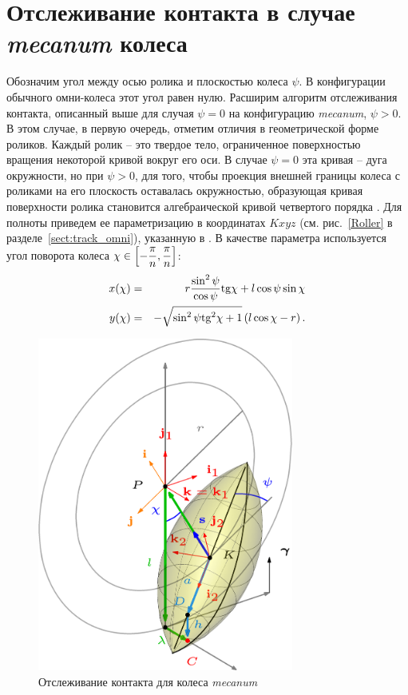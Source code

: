 \section{Отслеживание контакта в случае \textit{mecanum} колеса}\label{sect:track_mecanum}

Обозначим угол между осью ролика и плоскостью колеса $\psi$. В конфигурации обычного омни-колеса этот угол равен нулю. Расширим алгоритм отслеживания контакта, описанный выше для случая $\psi = 0$ на конфигурацию \textit{mecanum}, $\psi > 0$. В этом случае, в первую очередь, отметим отличия в геометрической форме роликов. Каждый ролик -- это твердое тело, ограниченное поверхностью вращения некоторой кривой вокруг его оси. В случае $\psi = 0$ эта кривая -- дуга окружности, но при $\psi > 0$, для того, чтобы проекция внешней границы колеса с роликами на его плоскость оставалась окружностью, образующая кривая поверхности ролика становится алгебраической кривой четвертого порядка \cite{Gfrerrer2008}. Для полноты приведем ее параметризацию в координатах $Kxyz$ (см. рис.~\ref{Roller} в разделе~\ref{sect:track_omni}), указанную в \cite{Gfrerrer2008}. В качестве параметра используется угол поворота колеса $\chi \in \left[ -\displaystyle\frac{\displaystyle \pi}{\displaystyle n}, \displaystyle\frac{\displaystyle \pi}{\displaystyle n} \right]$:
\begin{eqnarray*}
    x(\chi) & = & r\displaystyle\frac{\displaystyle \sin^2\psi}{\displaystyle \cos\psi}\mathrm{tg}\chi + l\cos\psi\sin\chi \\
    y(\chi) & = & -\sqrt{\sin^2\psi\mathrm{tg}^2\chi + 1}\left(l\cos\chi - r\right).
\end{eqnarray*}

\begin{figure}[H]
    \centering
    \includegraphics[width=0.75\textwidth]{./content/pic/asy/pic_mecanum.png}
    \caption{Отслеживание контакта для колеса \textit{mecanum}}
    \label{fig:mecanum}
\end{figure}

